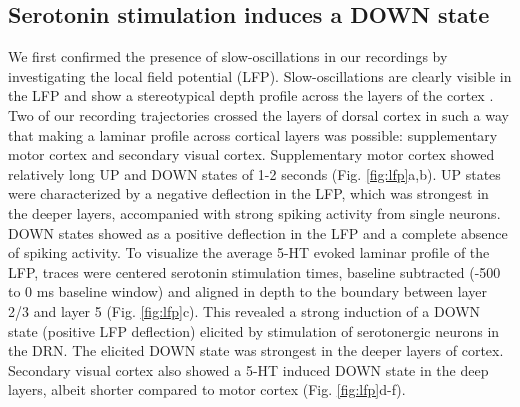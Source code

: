 \documentclass[11pt,a4paper,onecolumn]{article}
\begin{document}
\subsection*{Serotonin stimulation induces a DOWN state}
We first confirmed the presence of slow-oscillations in our recordings by investigating the local field potential (LFP). Slow-oscillations are clearly visible in the LFP and show a stereotypical depth profile across the layers of the cortex \citep{fiath_laminar_2016}. Two of our recording trajectories crossed the layers of dorsal cortex in such a way that making a laminar profile across cortical layers was possible: supplementary motor cortex and secondary visual cortex. Supplementary motor cortex showed relatively long UP and DOWN states of 1-2 seconds (Fig. \ref{fig:lfp}a,b). UP states were characterized by a negative deflection in the LFP, which was strongest in the deeper layers, accompanied with strong spiking activity from single neurons. DOWN states showed as a positive deflection in the LFP and a complete absence of spiking activity. To visualize the average 5-HT evoked laminar profile of the LFP, traces were centered serotonin stimulation times, baseline subtracted (-500 to 0 ms baseline window) and aligned in depth to the boundary between layer 2/3 and layer 5 (Fig. \ref{fig:lfp}c). This revealed a strong induction of a DOWN state (positive LFP deflection) elicited by stimulation of serotonergic neurons in the DRN. The elicited DOWN state was strongest in the deeper layers of cortex. Secondary visual cortex also showed a 5-HT induced DOWN state in the deep layers, albeit shorter compared to motor cortex (Fig. \ref{fig:lfp}d-f).
\end{document}
